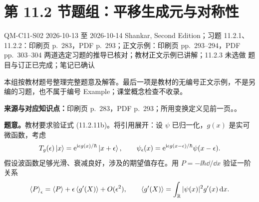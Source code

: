 \section{第 11.2 节题组：平移生成元与对称性}
\label{exercises:QM-C11-S02}
\exercisemeta
  {QM-C11-S02}
  {2026-10-13 至 2026-10-14}
  {Shankar, Second Edition；习题 11.2.1、11.2.2：印刷页 p.~283，PDF p.~293；正文示例：印刷页 pp.~293--294，PDF pp.~303--304}
  {两道选定习题的推导已核对；教材正文示例已讲解；11.2.3 未选做}
  {题目与订正已完成；笔记已确认}

本组按教材题号整理完整题意及解答。最后一项是教材的无编号正文示例，不是另编的习题，也不属于编号 Example；课堂概念检查不收录。

\textbf{来源与对应知识点：}印刷页 p.~283，PDF p.~293；所用变换定义见前一页。。

\textbf{题意。}教材要求验证式 (11.2.11b)。将引用展开：设 $\psi$ 已归一化，$g(x)$ 是实可微函数，考虑
\begin{equation}
  T_g(\epsilon)\left|x\right\rangle
    =\mathrm{e}^{\mathrm{i}\epsilon g(x)/\hbar}\left|x+\epsilon\right\rangle,
  \qquad
  \psi_\epsilon(x)
    =\mathrm{e}^{\mathrm{i}\epsilon g(x-\epsilon)/\hbar}\psi(x-\epsilon).
\end{equation}
假设波函数足够光滑、衰减良好，涉及的期望值存在。用 $P=-\ii\hbar\dd/\dd x$ 验证一阶关系
\begin{equation}
  \left\langle P \right\rangle_\epsilon=\left\langle P \right\rangle
        +\epsilon\left\langle g'(X) \right\rangle+O(\epsilon^2),
  \qquad
  \left\langle g'(X) \right\rangle=\int_{\mathbb{R}}|\psi(x)|^2g'(x)\mathop{}\!\mathrm{d} x.
\end{equation}

